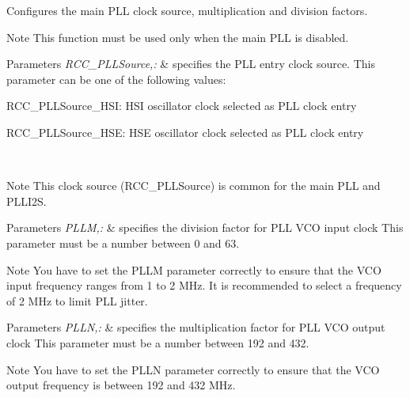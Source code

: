 Configures the main P\-L\-L clock source, multiplication and division factors. 

\begin{DoxyNote}{Note}
This function must be used only when the main P\-L\-L is disabled.
\end{DoxyNote}

\begin{DoxyParams}{Parameters}
{\em R\-C\-C\-\_\-\-P\-L\-L\-Source,\-:} & specifies the P\-L\-L entry clock source. This parameter can be one of the following values\-: \begin{DoxyItemize}
\item R\-C\-C\-\_\-\-P\-L\-L\-Source\-\_\-\-H\-S\-I\-: H\-S\-I oscillator clock selected as P\-L\-L clock entry \item R\-C\-C\-\_\-\-P\-L\-L\-Source\-\_\-\-H\-S\-E\-: H\-S\-E oscillator clock selected as P\-L\-L clock entry \end{DoxyItemize}
\\
\hline
\end{DoxyParams}
\begin{DoxyNote}{Note}
This clock source (R\-C\-C\-\_\-\-P\-L\-L\-Source) is common for the main P\-L\-L and P\-L\-L\-I2\-S.
\end{DoxyNote}

\begin{DoxyParams}{Parameters}
{\em P\-L\-L\-M,\-:} & specifies the division factor for P\-L\-L V\-C\-O input clock This parameter must be a number between 0 and 63. \\
\hline
\end{DoxyParams}
\begin{DoxyNote}{Note}
You have to set the P\-L\-L\-M parameter correctly to ensure that the V\-C\-O input frequency ranges from 1 to 2 M\-Hz. It is recommended to select a frequency of 2 M\-Hz to limit P\-L\-L jitter.
\end{DoxyNote}

\begin{DoxyParams}{Parameters}
{\em P\-L\-L\-N,\-:} & specifies the multiplication factor for P\-L\-L V\-C\-O output clock This parameter must be a number between 192 and 432. \\
\hline
\end{DoxyParams}
\begin{DoxyNote}{Note}
You have to set the P\-L\-L\-N parameter correctly to ensure that the V\-C\-O output frequency is between 192 and 432 M\-Hz.
\end{DoxyNote}

